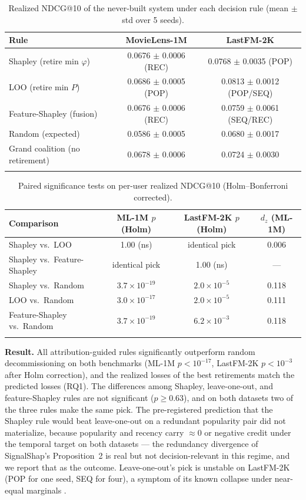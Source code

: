\documentclass[pdflatex,sn-mathphys-num]{sn-jnl}
\theoremstyle{thmstyleone}%
\theoremstyle{thmstyletwo}%
\theoremstyle{thmstylethree}%
\newcommand{\pred}{P}
\begin{document}
\begin{table}[h]
\caption{Realized NDCG@10 of the never-built system under each decision rule (mean $\pm$ std over 5 seeds).}
\label{tab7}
\begin{tabular*}{\textwidth}{@{\extracolsep\fill}lcc}
\toprule
Rule & MovieLens-1M & LastFM-2K \\
\midrule
Shapley (retire min $\varphi$) & 0.0676 $\pm$ 0.0006 (REC) & 0.0768 $\pm$ 0.0035 (POP) \\
LOO (retire min $\pred$) & 0.0686 $\pm$ 0.0005 (POP) & 0.0813 $\pm$ 0.0012 (POP/SEQ) \\
Feature-Shapley (fusion) & 0.0676 $\pm$ 0.0006 (REC) & 0.0759 $\pm$ 0.0061 (SEQ/REC) \\
Random (expected) & 0.0586 $\pm$ 0.0005 & 0.0680 $\pm$ 0.0017 \\
\midrule
Grand coalition (no retirement) & 0.0678 $\pm$ 0.0006 & 0.0724 $\pm$ 0.0030 \\
\botrule
\end{tabular*}
\end{table}

\begin{table}[h]
\caption{Paired significance tests on per-user realized NDCG@10 (Holm--Bonferroni corrected).}
\label{tab8}
\begin{tabular*}{\textwidth}{@{\extracolsep\fill}lccc}
\toprule
Comparison & ML-1M $p$ (Holm) & LastFM-2K $p$ (Holm) & $d_z$ (ML-1M) \\
\midrule
Shapley vs.\ LOO & 1.00 (ns) & identical pick & 0.006 \\
Shapley vs.\ Feature-Shapley & identical pick & 1.00 (ns) & --- \\
Shapley vs.\ Random & $3.7\times10^{-19}$ & $2.0\times10^{-5}$ & 0.118 \\
LOO vs.\ Random & $3.0\times10^{-17}$ & $2.0\times10^{-5}$ & 0.111 \\
Feature-Shapley vs.\ Random & $3.7\times10^{-19}$ & $6.2\times10^{-3}$ & 0.118 \\
\botrule
\end{tabular*}
\end{table}

\textbf{Result.} All attribution-guided rules significantly outperform random decommissioning on both benchmarks (ML-1M $p<10^{-17}$, LastFM-2K $p<10^{-3}$ after Holm correction), and the realized losses of the best retirements match the predicted losses (RQ1). The differences among Shapley, leave-one-out, and feature-Shapley rules are not significant ($p\ge 0.63$), and on both datasets two of the three rules make the same pick. The pre-registered prediction that the Shapley rule would beat leave-one-out on a redundant popularity pair did not materialize, because popularity and recency carry $\approx 0$ or negative credit under the temporal target on both datasets --- the redundancy divergence of SignalShap's Proposition~2 is real but not decision-relevant in this regime, and we report that as the outcome. Leave-one-out's pick is unstable on LastFM-2K (POP for one seed, SEQ for four), a symptom of its known collapse under near-equal marginals \cite{louhichi2026signalshap}.
\end{document}
